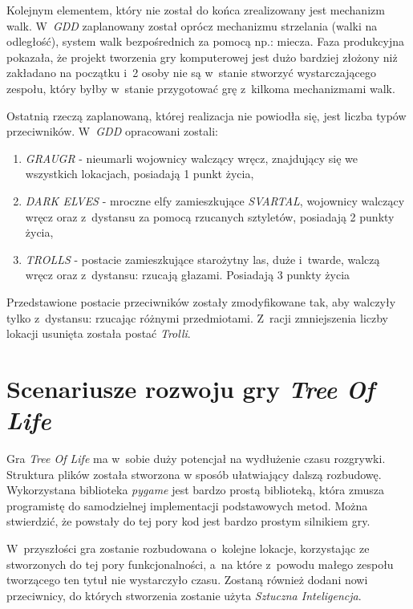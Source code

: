 \documentclass[12pt,a4paper,oneside]{book}
\theoremstyle{definition}
\numberwithin{equation}{chapter}
\begin{document}
\par Kolejnym elementem, który nie został do końca zrealizowany jest mechanizm walk. W~\textit{GDD} zaplanowany został oprócz mechanizmu strzelania (walki na odległość), system walk bezpośrednich za pomocą np.: miecza. Faza produkcyjna pokazała, że projekt tworzenia gry komputerowej jest dużo bardziej złożony niż zakładano na początku i~2 osoby nie są w~stanie stworzyć wystarczającego zespołu, który byłby w~stanie przygotować grę z~kilkoma mechanizmami walk.

\par Ostatnią rzeczą zaplanowaną, której realizacja nie powiodła się, jest liczba typów przeciwników. W~\textit{GDD} opracowani zostali:
\begin{enumerate}
    \item \textit{GRAUGR} - nieumarli wojownicy walczący wręcz, znajdujący się we wszystkich lokacjach, posiadają 1 punkt życia,
    \item \textit{DARK ELVES} - mroczne elfy zamieszkujące \textit{SVARTAL}, wojownicy walczący wręcz oraz z~dystansu za pomocą rzucanych sztyletów, posiadają 2 punkty życia,
    \item \textit{TROLLS} - postacie zamieszkujące starożytny las, duże i~twarde, walczą wręcz oraz z~dystansu: rzucają głazami. Posiadają 3 punkty życia
\end{enumerate}
\par Przedstawione postacie przeciwników zostały zmodyfikowane tak, aby walczyły tylko z~dystansu: rzucając różnymi przedmiotami. Z~racji zmniejszenia liczby lokacji usunięta została postać \textit{Trolli}.

\section{Scenariusze rozwoju gry \textit{Tree Of Life}}
\par Gra \textit{Tree Of Life} ma w~sobie duży potencjał na wydłużenie czasu rozgrywki. Struktura plików została stworzona w sposób ułatwiający dalszą rozbudowę. Wykorzystana biblioteka \textit{pygame} jest bardzo prostą biblioteką, która zmusza programistę do samodzielnej implementacji podstawowych metod. Można stwierdzić, że powstały do tej pory kod jest bardzo prostym silnikiem gry.
\par W~przyszłości gra zostanie rozbudowana o~kolejne lokacje, korzystając ze stworzonych do tej pory funkcjonalności, a~na które z~powodu małego zespołu tworzącego ten tytuł nie wystarczyło czasu. Zostaną również dodani nowi przeciwnicy, do których stworzenia zostanie użyta \textit{Sztuczna Inteligencja}.
\end{document}
